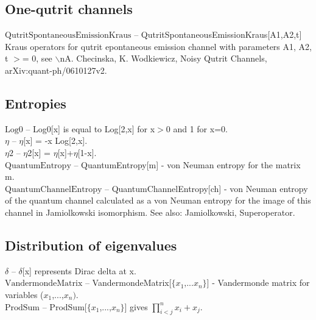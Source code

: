 \subsection{One-qutrit channels}

\noindent\textbf{$ \text{QutritSpontaneousEmissionKraus} $ }-- QutritSpontaneousEmissionKraus[A1,A2,t] Kraus operators for qutrit epontaneous emission channel with parameters A1, A2, t $>$= 0, see $\backslash $nA. Checinska, K. Wodkiewicz, Noisy Qutrit Channels, arXiv:quant-ph/0610127v2.$  $\\

\subsection{Entropies}

\noindent\textbf{$ \text{Log0} $ }-- Log0[x] is equal to Log[2,x] for x$>$0 and 1 for x=0.$  $\\

\noindent\textbf{$ \eta  $ }-- $\eta $[x] = -x Log[2,x].$  $\\

\noindent\textbf{$ \text{$\eta $2} $ }-- $\eta $2[x] = $\eta $[x]+$\eta $[1-x].$  $\\

\noindent\textbf{$ \text{QuantumEntropy} $ }-- QuantumEntropy[m] - von Neuman entropy for the matrix m.$  $\\

\noindent\textbf{$ \text{QuantumChannelEntropy} $ }-- QuantumChannelEntropy[ch] - von Neuman entropy of the quantum channel calculated as a von Neuman entropy for the image of this channel in Jamiolkowski isomorphism. See also: Jamiolkowski, Superoperator.$  $\\

\subsection{Distribution of eigenvalues}

\noindent\textbf{$ \delta  $ }-- $\delta $[x] represents Dirac delta at x.$  $\\

\noindent\textbf{$ \text{VandermondeMatrix} $ }-- VandermondeMatrix[$\{$$ x_1\text{,...}x_n $$\}$] - Vandermonde matrix for variables ($ x_1 $,...,$ x_n\text{).} $\\

\noindent\textbf{$ \text{ProdSum} $ }-- ProdSum[$\{$$ x_1 $,...,$ x_n $$\}$] gives $ \prod _{i<j}^nx_i+x_j. $\\

